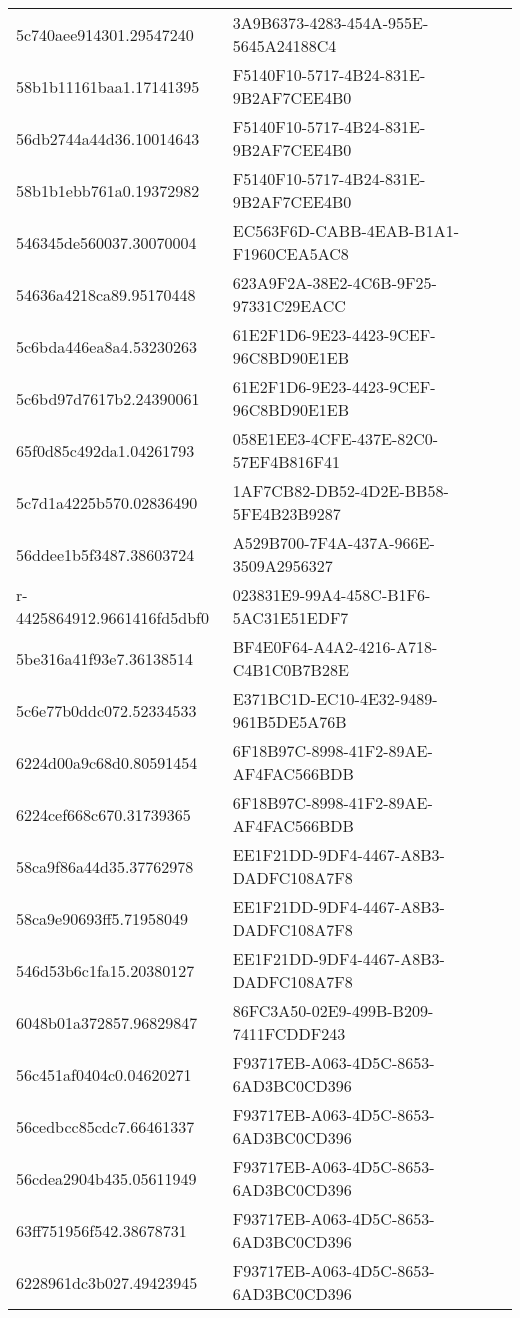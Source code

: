 \begin{tabular}{ll}
5c740aee914301.29547240 & 3A9B6373-4283-454A-955E-5645A24188C4 \\
58b1b11161baa1.17141395 & F5140F10-5717-4B24-831E-9B2AF7CEE4B0 \\
56db2744a44d36.10014643 & F5140F10-5717-4B24-831E-9B2AF7CEE4B0 \\
58b1b1ebb761a0.19372982 & F5140F10-5717-4B24-831E-9B2AF7CEE4B0 \\
546345de560037.30070004 & EC563F6D-CABB-4EAB-B1A1-F1960CEA5AC8 \\
54636a4218ca89.95170448 & 623A9F2A-38E2-4C6B-9F25-97331C29EACC \\
5c6bda446ea8a4.53230263 & 61E2F1D6-9E23-4423-9CEF-96C8BD90E1EB \\
5c6bd97d7617b2.24390061 & 61E2F1D6-9E23-4423-9CEF-96C8BD90E1EB \\
65f0d85c492da1.04261793 & 058E1EE3-4CFE-437E-82C0-57EF4B816F41 \\
5c7d1a4225b570.02836490 & 1AF7CB82-DB52-4D2E-BB58-5FE4B23B9287 \\
56ddee1b5f3487.38603724 & A529B700-7F4A-437A-966E-3509A2956327 \\
r-4425864912.9661416fd5dbf0 & 023831E9-99A4-458C-B1F6-5AC31E51EDF7 \\
5be316a41f93e7.36138514 & BF4E0F64-A4A2-4216-A718-C4B1C0B7B28E \\
5c6e77b0ddc072.52334533 & E371BC1D-EC10-4E32-9489-961B5DE5A76B \\
6224d00a9c68d0.80591454 & 6F18B97C-8998-41F2-89AE-AF4FAC566BDB \\
6224cef668c670.31739365 & 6F18B97C-8998-41F2-89AE-AF4FAC566BDB \\
58ca9f86a44d35.37762978 & EE1F21DD-9DF4-4467-A8B3-DADFC108A7F8 \\
58ca9e90693ff5.71958049 & EE1F21DD-9DF4-4467-A8B3-DADFC108A7F8 \\
546d53b6c1fa15.20380127 & EE1F21DD-9DF4-4467-A8B3-DADFC108A7F8 \\
6048b01a372857.96829847 & 86FC3A50-02E9-499B-B209-7411FCDDF243 \\
56c451af0404c0.04620271 & F93717EB-A063-4D5C-8653-6AD3BC0CD396 \\
56cedbcc85cdc7.66461337 & F93717EB-A063-4D5C-8653-6AD3BC0CD396 \\
56cdea2904b435.05611949 & F93717EB-A063-4D5C-8653-6AD3BC0CD396 \\
63ff751956f542.38678731 & F93717EB-A063-4D5C-8653-6AD3BC0CD396 \\
6228961dc3b027.49423945 & F93717EB-A063-4D5C-8653-6AD3BC0CD396 \\

\end{tabular}

